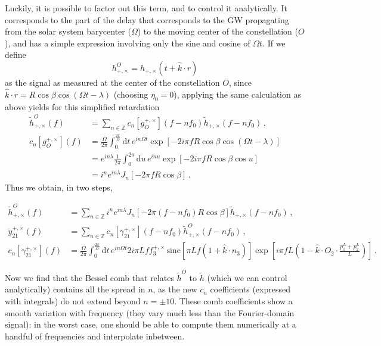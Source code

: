 \documentclass[aps,showpacs,%
prd,superscriptaddress,nofootinbib]{revtex4}
\newcommand{\be}{\begin{equation}}
\newcommand{\ee}{\end{equation}}
\newcommand\ud{{\mathrm{d}}}
\newcommand{\nn}{\nonumber}
\newcommand{\hatk}{\hat{k}}
\newcommand{\sinc}{\,\mathrm{sinc}}
\begin{document}
Luckily, it is possible to factor out this term, and to control it analytically. It corresponds to the part of the delay that corresponds to the GW propagating from the solar system barycenter ($\Omega$) to the moving center of the constellation ($O$), and has a simple expression involving only the sine and cosine of $\Omega t$. If we define
%
\be
	h_{+,\times}^{O} = h_{+,\times} (t + \hatk \cdot r)
\ee
%
as the signal as measured at the center of the constellation $O$, since $\hatk \cdot r = R \cos \beta \cos(\Omega t - \lambda)$ (choosing $\eta_{0} = 0$), applying the same calculation as above yields for this simplified retardation
%
\begin{align}
	\tilde{h}_{+,\times}^{O}\left(f\right) &= \sum\limits_{n\in \mathbb{Z}} c_{n}[g_{O}^{+,\times}]\left(f - n f_{0}\right) \tilde{h}_{+,\times}\left(f - n f_{0}\right)\,, \\
	c_{n}[g_{O}^{+,\times}]\left(f\right) &= \frac{\Omega}{2\pi}\int_{0}^{\frac{2\pi}{\Omega}} \ud t \, e^{i n \Omega t} \exp\left[ -2i \pi f R \cos \beta \cos (\Omega t - \lambda) \right] \nn\\ 
	&= e^{i n \lambda} \frac{1}{2\pi}\int_{0}^{2\pi} \ud u \, e^{i n u} \exp\left[ -2i \pi f R \cos \beta \cos u \right] \nn\\
	&= i^{n}e^{i n \lambda} J_{n}\left[ -2\pi f R \cos \beta \right] \,.
\end{align}
%
Thus we obtain, in two steps,
%
\begin{widetext}
\begin{subequations}
\begin{align}
	\tilde{h}_{+,\times}^{O}\left(f\right) &= \sum\limits_{n\in \mathbb{Z}} i^{n}e^{i n \lambda} J_{n}\left[ -2\pi \left(f - n f_{0}\right) R \cos \beta \right]\tilde{h}_{+,\times}\left(f - n f_{0}\right)\,, \\
	\tilde{y}_{21}^{+,\times}(f) &= \sum\limits_{n\in \mathbb{Z}} c_{n}[\gamma_{21}^{+,\times}]\left(f - n f_{0}\right) \tilde{h}_{+,\times}^{O}\left(f - n f_{0}\right)\,, \\
	c_{n}[\gamma_{21}^{+,\times}]\left(f\right) &= \frac{\Omega}{2\pi}\int_{0}^{\frac{2\pi}{\Omega}} \ud t \, e^{i n \Omega t} 2 i\pi L f f_{3}^{+,\times}\sinc\left[ \pi L f (1+\hatk \cdot n_{3})\right]\exp\left[ i \pi f L\left(1 - \hatk \cdot O_{2} \cdot \frac{p_{1}^{L}+p_{2}^{L}}{L} \right) \right] \,.
\end{align}
\end{subequations}
\end{widetext}
%
Now we find that the Bessel comb that relates $\tilde{h}^{O}$ to $\tilde{h}$ (which we can control analytically) contains all the spread in $n$, as the new $c_{n}$ coefficients (expressed with integrals) do not extend beyond $n=\pm 10$. These comb coefficients show a smooth variation with frequency (they vary much less than the Fourier-domain signal): in the worst case, one should be able to compute them numerically at a handful of frequencies and interpolate inbetween.
\end{document}
